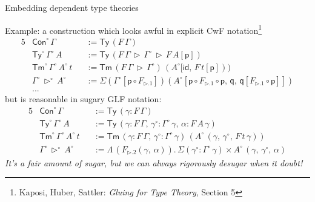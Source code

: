 \documentclass[dvipsnames,aspectratio=169]{beamer}
\newcommand{\ms}[1]{\mathsf{#1}}
\newcommand{\bs}[1]{\boldsymbol{#1}}
\newcommand{\id}{\mathsf{id}}
\newcommand{\Con}{\mathsf{Con}}
\newcommand{\Tm}{\mathsf{Tm}}
\newcommand{\Ty}{\mathsf{Ty}}
\newcommand{\Y}{\mathsf{Y}}
\newcommand{\ext}{\triangleright}
\begin{document}

\begin{frame}{Embedding dependent type theories}

Example: a construction which looks awful in explicit CwF notation\footnote{Kaposi, Huber, Sattler: \emph{Gluing for Type Theory}, Section 5}
{\small
\begin{alignat*}{5}
  &\Con^{\circ}\,\Gamma && := \Ty\,(F\,\Gamma)\\
  &\Ty^{\circ}\,\Gamma^{\circ}\,A && := \Ty\,(F\,\Gamma\,\ext\,\Gamma^{\circ}\,\ext\,F\,A[\ms{p}])\\
  &\Tm^{\circ}\,\Gamma^{\circ}\,A^{\circ}\,t && := \Tm\,(F\,\Gamma\,\ext\,\Gamma^{\circ})\,(A^{\circ}[\id,\,F\,t[\ms{p}]))\\
  & \Gamma^{\circ}\,\ext^{\circ}\,A^{\circ} && := \Sigma(\Gamma^{\circ}[\ms{p}\circ F_{\ext.1}])(A^{\circ}[\ms{p} \circ F_{\ext.1} \circ \ms{p},\,\ms{q},\,\ms{q}[F_{\ext.1} \circ \ms{p}]])\\
  & ... &&
\end{alignat*}
\vspace{-1.0em}
{\normalsize but is reasonable in sugary GLF notation:}
\begin{alignat*}{5}
  &\Con^{\circ}\,\Gamma && := \Ty\,(\gamma : F\,\Gamma)\\
  &\Ty^{\circ}\,\Gamma^{\circ}\,A && := \Ty\,(\gamma : F\,\Gamma,\,\gamma^{\circ} : \Gamma^{\circ}\,\gamma,\,\alpha : F\,A\,\gamma)\\
  &\Tm^{\circ}\,\Gamma^{\circ}\,A^{\circ}\,t && := \Tm\,(\gamma : F\,\Gamma,\,\gamma^{\circ} : \Gamma^{\circ}\,\gamma)\,(A^{\circ}\,(\gamma,\,\gamma^{\circ},\,F\,t\,\gamma))\\
  & \Gamma^{\circ}\,\ext^{\circ}\,A^{\circ} &&:= \Lambda\,(F_{\ext.2}(\gamma,\,\alpha)).\, \Sigma(\gamma^{\circ} : \Gamma^{\circ}\,\gamma) \times A^{\circ}\,(\gamma,\,\gamma^{\circ},\,\alpha)
\end{alignat*}
}
\emph{It's a fair amount of sugar, but we can always rigorously desugar when it doubt!}

\end{frame}
\end{document}
